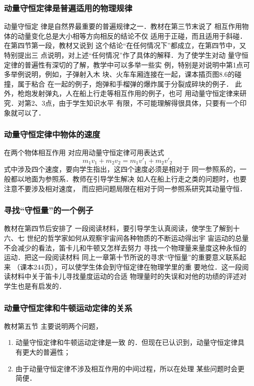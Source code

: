 \subsubsection{动量守恒定律是普遍适用的物理规律}

动量守恒定
律是自然界最重要的普遍规律之一．教材在第三节末说了
相互作用物体的动量变化总是大小相等方向相反的结论不仅
适用于正碰，而且适用于斜碰．在第四节第一段，教材又说到
这个结论“在任何情况下”都成立，在第四节中，又特别提出三
点说明，对上述“任何情况”作了具体的解释．为了使学生对动
量守恒定律的普遍性有深切的了解，教学中可以多举一些实
例，特别是对说明中第1点可多举例说明，例如，子弹射入木
块、火车车厢连接在一起，课本插页图8.6的碰撞，属于粘合
在一起的例子，炮弹和手榴弹的爆炸属于分裂成碎块的例子．
此外，枪炮发射弹丸，人在船上行走等相互作用的例子，也可
用动量守恒定律来研究．对第2、3点，由于学生知识水平
有限，不可能理解得很具体，只要有一个印象就可以了．

\subsubsection{动量守恒定律中物体的速度}

在两个物体相互作用
对应用动量守恒定律可用表达式
\[m_1v_1+m_2v_2=m_1v'_1+m_2v'_2\]
式中涉及四个速度，要向学生指出，这四个速度必须是相对于
同一参照系的，一般都以地面为参照系．教师在引导学生解决
如人在船上行走之类的问题时，也要注意不要涉及相对速度，
而应把问题局限在相对于同一参照系研究其动量守恒．

\subsubsection{寻找“守恒量”的一个例子}

教材在第四节后安排了
一段阅读材料，要引导学生认真阅读，使学生了解到十六、七
世纪的哲学家如何从观察宇宙间各种物质的不断运动得出宇
宙运动的总量不会减少的看法，笛卡儿和牛顿又怎样去努力
寻找一个物理量来量度这种永恒的运动．把这一段阅读材料
同上一章第十节所说的寻求“守恒量”的重要意义联系起来
（课本244页），可以使学生体会到守恒定律在物理学里的重
要地位．这一段阅读材料中关于笛卡儿寻找量度运动的合适
物理量时的失误和对他的功绩的评述对学生也是有启发的．

\subsubsection{动量守恒定律和牛顿运动定律的关系}

教材第五节
主要说明两个问题，
\begin{enumerate}
 \item 动量守恒定律和牛顿运动定律是一致
的．但现在已认识到，动量守恒定律具有更大的普遍性；
\item 由于动量守恒定律不涉及相互作用的中间过程，所以在处理
某些问题时会更简便．
\end{enumerate}

